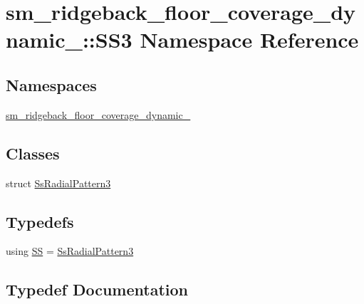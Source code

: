 \hypertarget{namespacesm__ridgeback__floor__coverage__dynamic__1_1_1SS3}{}\section{sm\+\_\+ridgeback\+\_\+floor\+\_\+coverage\+\_\+dynamic\+\_\+:\+:S\+S3 Namespace Reference}
\label{namespacesm__ridgeback__floor__coverage__dynamic__1_1_1SS3}
\subsection*{Namespaces}
\begin{DoxyCompactItemize}
\item 
 \hyperlink{namespacesm__ridgeback__floor__coverage__dynamic__1_1_1SS3_1_1sm__ridgeback__floor__coverage__dynamic__1}{sm\+\_\+ridgeback\+\_\+floor\+\_\+coverage\+\_\+dynamic\+\_}
\end{DoxyCompactItemize}
\subsection*{Classes}
\begin{DoxyCompactItemize}
\item 
struct \hyperlink{structsm__ridgeback__floor__coverage__dynamic__1_1_1SS3_1_1SsRadialPattern3}{Ss\+Radial\+Pattern3}
\end{DoxyCompactItemize}
\subsection*{Typedefs}
\begin{DoxyCompactItemize}
\item 
using \hyperlink{namespacesm__ridgeback__floor__coverage__dynamic__1_1_1SS3_a365075198199db2a656a36cace4d7cc9}{SS} = \hyperlink{structsm__ridgeback__floor__coverage__dynamic__1_1_1SS3_1_1SsRadialPattern3}{Ss\+Radial\+Pattern3}
\end{DoxyCompactItemize}


\subsection{Typedef Documentation}
\mbox{\label{namespacesm__ridgeback__floor__coverage__dynamic__1_1_1SS3_a365075198199db2a656a36cace4d7cc9}} 

